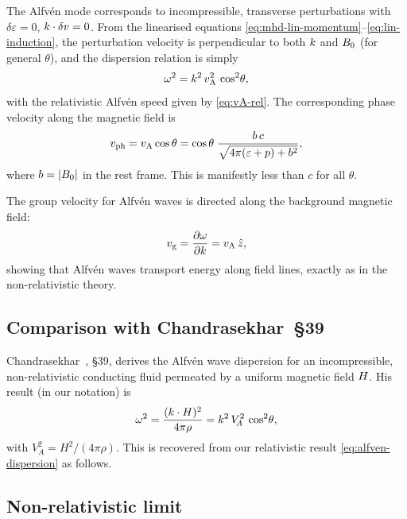 The Alfv\'en mode corresponds to incompressible, transverse perturbations
with $\delta\varepsilon=0$, $k\cdot\delta v=0$.  From the
linearised equations \eqref{eq:mhd-lin-momentum}--\eqref{eq:lin-induction},
the perturbation velocity is perpendicular to both $k$ and
$B_{0}$ (for general $\theta$), and the dispersion relation is
simply
\begin{equation}
  \omega^{2} = k^{2}\,v_{\mathrm{A}}^{2}\,\cos^{2}\!\theta,
  \label{eq:alfven-dispersion}
\end{equation}
with the relativistic Alfv\'en speed given by \eqref{eq:vA-rel}.  The
corresponding phase velocity along the magnetic field is
\begin{equation}
  v_{\mathrm{ph}} = v_{\mathrm{A}}\cos\theta
  = \cos\theta\;\frac{b\,c}{\sqrt{4\pi(\varepsilon+p)+b^{2}}},
  \label{eq:alfven-phase}
\end{equation}
where $b = |B_{0}|$ in the rest frame.  This is manifestly less
than $c$ for all $\theta$.

The group velocity for Alfv\'en waves is directed along the background
magnetic field:
\begin{equation}
  v_{\mathrm{g}}
  = \frac{\partial\omega}{\partial k}
  = v_{\mathrm{A}}\,\hat{z},
  \label{eq:alfven-group}
\end{equation}
showing that Alfv\'en waves transport energy along field lines, exactly
as in the non-relativistic theory.

\subsection{Comparison with Chandrasekhar~\S39}

Chandrasekhar~\cite{Chandrasekhar1961}, \S39, derives the Alfv\'en wave
dispersion for an incompressible, non-relativistic conducting fluid
permeated by a uniform magnetic field $H$.  His result (in our
notation) is
\begin{equation}
  \omega^{2} = \frac{(k\cdot H)^{2}}{4\pi\rho}
  = k^{2}\,V_{\!A}^{2}\,\cos^{2}\!\theta,
  \label{eq:alfven-chandrasekhar}
\end{equation}
with $V_{\!A}^{2} = H^{2}/(4\pi\rho)$.  This is recovered from our
relativistic result \eqref{eq:alfven-dispersion} as follows.

\subsection{Non-relativistic limit}

